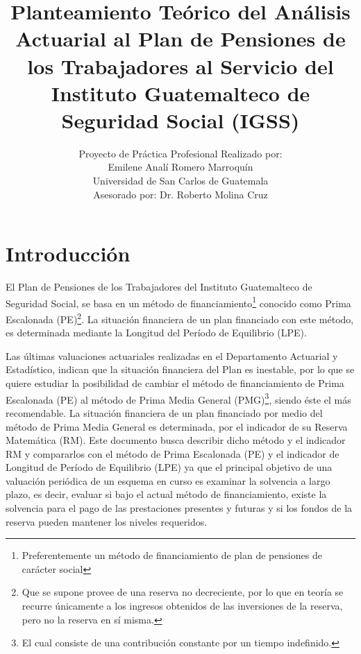 \documentclass[12pt,letterpaper,titlepage]{article}
\title{ Planteamiento Teórico del Análisis Actuarial al Plan de Pensiones de los Trabajadores al Servicio del Instituto Guatemalteco de Seguridad Social (IGSS) }
\author{Proyecto de Práctica Profesional Realizado por:\\
	Emilene Analí Romero Marroquín\\
	Universidad de San Carlos de Guatemala\\
	Asesorado por: Dr. Roberto Molina Cruz\\}
\begin{document}
	{\onehalfspacing
\begin{titlepage}
	\renewcommand{\thepage}{}
	\pagestyle{empty}
	\maketitle
\end{titlepage}\newpage
\setcounter{page}{2}
\tableofcontents
\newpage
\nocite{*}
\section{Introducción}

El Plan de Pensiones de los Trabajadores del Instituto Guatemalteco de Seguridad Social, se basa en un método de  financiamiento\footnote{Preferentemente un método de financiamiento de plan de pensiones de carácter social} conocido como Prima Escalonada (PE)\footnote{Que se supone provee de una reserva no decreciente, por lo que en teoría se recurre únicamente a los ingresos obtenidos de las inversiones de la reserva, pero no la reserva en sí misma.}. La situación financiera de un plan financiado con este método, es determinada mediante la Longitud del Período de Equilibrio (LPE).\bigskip

Las últimas valuaciones actuariales realizadas en el Departamento Actuarial y Estadístico, indican que la situación financiera del Plan es inestable, por lo que se quiere estudiar la posibilidad de cambiar el método de financiamiento de Prima Escalonada (PE) al método de Prima Media General (PMG)\footnote{El cual consiste de una contribución constante por un tiempo indefinido.}, siendo éste el más recomendable. La situación financiera de un plan financiado por medio del método de Prima Media General es determinada, por el indicador de su Reserva Matemática (RM). Este documento busca describir dicho método y el indicador RM y compararlos con el método de Prima Escalonada (PE) y el indicador de Longitud de Período de Equilibrio (LPE) ya que el principal objetivo de una valuación periódica de un esquema en curso es examinar la solvencia a largo plazo, es decir, evaluar si bajo el actual método de financiamiento, existe la solvencia para el pago de las prestaciones presentes y futuras y si los fondos de la reserva pueden mantener los niveles requeridos. \bigskip


}
\end{document}
